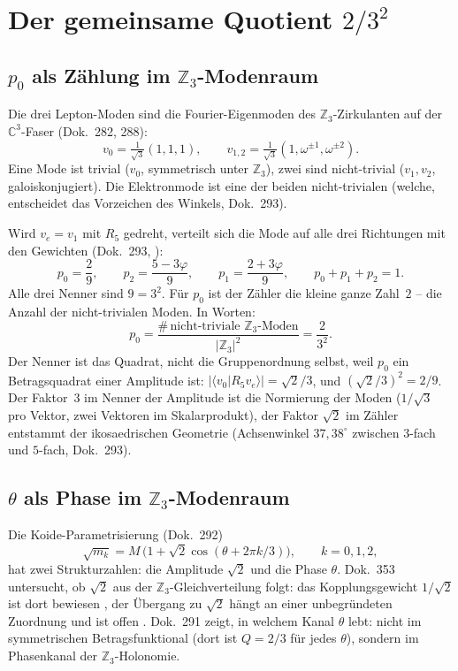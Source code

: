 \section{Der gemeinsame Quotient $2/3^2$}

\subsection{$p_0$ als Zählung im $\mathbb{Z}_3$-Modenraum}

Die drei Lepton-Moden sind die Fourier-Eigenmoden des $\mathbb{Z}_3$-Zirkulanten auf der
$\mathbb{C}^3$-Faser (Dok.~282, 288):
\[
  v_0 = \tfrac{1}{\sqrt3}(1,1,1),\qquad
  v_{1,2} = \tfrac{1}{\sqrt3}(1,\omega^{\pm1},\omega^{\pm2}).
\]
Eine Mode ist trivial ($v_0$, symmetrisch unter $\mathbb{Z}_3$), zwei sind nicht-trivial
($v_1,v_2$, galoiskonjugiert). Die Elektronmode ist eine der beiden nicht-trivialen (welche,
entscheidet das Vorzeichen des Winkels, Dok.~293).

Wird $v_e = v_1$ mit $R_5$ gedreht, verteilt sich die Mode auf alle drei Richtungen mit den
Gewichten (Dok.~293, \BM):
\[
  p_0 = \frac{2}{9},\qquad
  p_2 = \frac{5-3\varphi}{9},\qquad
  p_1 = \frac{2+3\varphi}{9},\qquad
  p_0+p_1+p_2 = 1.
\]
Alle drei Nenner sind $9 = 3^2$. Für $p_0$ ist der Zähler die kleine ganze Zahl~$2$ --
die Anzahl der nicht-trivialen Moden. In Worten:
\[
  p_0 = \frac{\#\,\text{nicht-triviale }\mathbb{Z}_3\text{-Moden}}{|\mathbb{Z}_3|^2}
  = \frac{2}{3^2}.
\]
Der Nenner ist das Quadrat, nicht die Gruppenordnung selbst, weil $p_0$ ein
Betragsquadrat einer Amplitude ist: $|\langle v_0|R_5 v_e\rangle| = \sqrt{2}/3$, und
$(\sqrt2/3)^2 = 2/9$. Der Faktor~$3$ im Nenner der Amplitude ist die Normierung der
Moden ($1/\sqrt3$ pro Vektor, zwei Vektoren im Skalarprodukt), der Faktor $\sqrt2$ im Zähler
entstammt der ikosaedrischen Geometrie (Achsenwinkel $37{,}38^\circ$ zwischen $3$-fach und
$5$-fach, Dok.~293).

\subsection{$\theta$ als Phase im $\mathbb{Z}_3$-Modenraum}

Die Koide-Parametrisierung (Dok.~292)
\[
  \sqrt{m_k} = M\,\bigl(1+\sqrt2\cos(\theta + 2\pi k/3)\bigr),\qquad k=0,1,2,
\]
hat zwei Strukturzahlen: die Amplitude $\sqrt2$ und die Phase $\theta$. Dok.~353 untersucht,
ob $\sqrt2$ aus der $\mathbb{Z}_3$-Gleichverteilung folgt: das Kopplungsgewicht $1/\sqrt2$
ist dort bewiesen \BM, der Übergang zu $\sqrt2$ hängt an einer unbegründeten Zuordnung
und ist offen \SM. Dok.~291 zeigt, in welchem Kanal
$\theta$ lebt: nicht im symmetrischen Betragsfunktional (dort ist $Q = 2/3$ für jedes $\theta$),
sondern im Phasenkanal der $\mathbb{Z}_3$-Holonomie.

